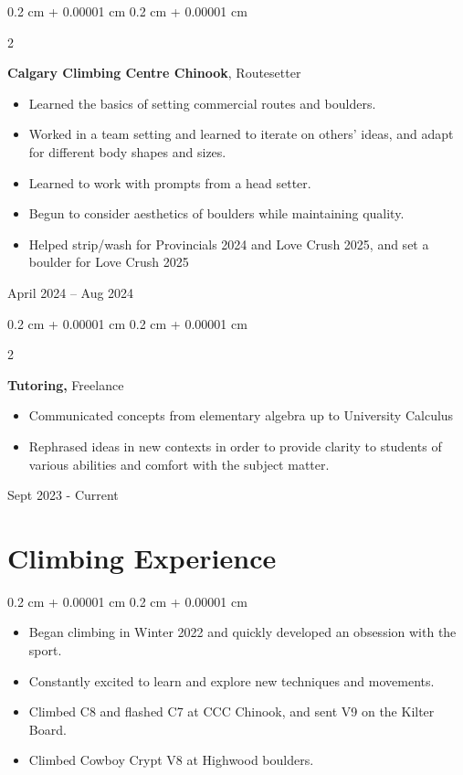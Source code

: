 \documentclass[10pt, letterpaper]{article}
\newenvironment{highlights}{
    \begin{itemize}[
        topsep=0.10 cm,
        parsep=0.10 cm,
        partopsep=0pt,
        itemsep=0pt,
        leftmargin=0.4 cm + 10pt
    ]
}{
    \end{itemize}
} %
\newenvironment{onecolentry}{
    \begin{adjustwidth}{
        0.2 cm + 0.00001 cm
    }{
        0.2 cm + 0.00001 cm
    }
}{
    \end{adjustwidth}
} %
\newenvironment{twocolentry}[2][]{
    \onecolentry
    \def\secondColumn{#2}
    \setcolumnwidth{\fill, 4.5 cm}
    \begin{paracol}{2}
}{
    \switchcolumn \raggedleft \secondColumn
    \end{paracol}
    \endonecolentry
} %
\begin{document}
        \begin{twocolentry}{
        April 2024 – Aug 2024
        }
            \textbf{Calgary Climbing Centre Chinook}, Routesetter
            \begin{highlights}
                \item Learned the basics of setting commercial routes and boulders.
                \item Worked in a team setting and learned to iterate on others' ideas, and adapt for different body shapes and sizes.
                \item Learned to work with prompts from a head setter.
                \item Begun to consider aesthetics of boulders while maintaining quality.
                \item Helped strip/wash for Provincials 2024 and Love Crush 2025, and set a boulder for Love Crush 2025
            \end{highlights}
        \end{twocolentry}
        \begin{twocolentry}{
                Sept 2023 - Current
            }

            \textbf{Tutoring, }Freelance
            \begin{highlights}
            \item Communicated concepts from elementary algebra up to University Calculus
            \item Rephrased ideas in new contexts in order to provide clarity to students of various abilities and comfort with the subject matter.
            \end{highlights}
        \end{twocolentry}
    
    \section{Climbing Experience}
    \begin{onecolentry}
        \begin{highlights}
            \item Began climbing in Winter 2022 and quickly developed an obsession with the sport.
            \item Constantly excited to learn and explore new techniques and movements.
            \item Climbed C8 and flashed C7 at CCC Chinook, and sent V9 on the Kilter Board.
            \item Climbed Cowboy Crypt V8 at Highwood boulders.
        \end{highlights}
    \end{onecolentry}
        
\end{document}

